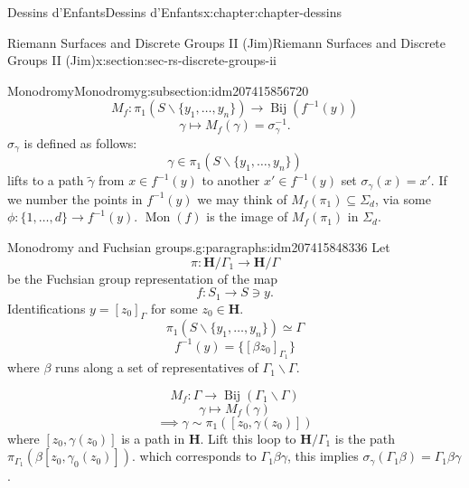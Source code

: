 \documentclass[oneside,10pt,]{book}
\numberwithin{equation}{section}
\newcommand{\inv}{^{-1}}
\newcommand{\lb}{[}
\newcommand{\rb}{]}
\newcommand{\HH}{\mathbf{H}}
\begin{document}
\begin{chapterptx}{Dessins d'Enfants}{}{Dessins d'Enfants}{}{}{x:chapter:chapter-dessins}
\begin{sectionptx}{Riemann Surfaces and Discrete Groups II (Jim)}{}{Riemann Surfaces and Discrete Groups II (Jim)}{}{}{x:section:sec-rs-discrete-groups-ii}
\begin{subsectionptx}{Monodromy}{}{Monodromy}{}{}{g:subsection:idm207415856720}
\begin{equation*}
M_f\colon \pi_1(S \smallsetminus \{y_1, \ldots, y_n\} )\to \operatorname{Bij} (f\inv (y))
\end{equation*}
%
\begin{equation*}
\gamma \mapsto M_f(\gamma) = \sigma_\gamma\inv\text{.}
\end{equation*}
\(\sigma_\gamma\) is defined as follows:%
\begin{equation*}
\gamma \in \pi_1(S\smallsetminus \{ y_1,\ldots, y_n\})
\end{equation*}
lifts to a path \(\widetilde \gamma\) from \(x\in f\inv(y)\) to another \(x' \in f\inv(y)\) set \(\sigma_\gamma(x) =x'\). If we number the points in \(f\inv (y)\) we may think of \(M_f(\pi_1)\subseteq \Sigma_d\), via some \(\phi\colon \{1,\ldots, d\}\to f\inv (y)\). \(\operatorname{Mon}(f)\) is the image of \(M_f(\pi_1)\) in \(\Sigma_d\).%
\begin{paragraphs}{Monodromy and Fuchsian groups.}{g:paragraphs:idm207415848336}%
Let%
\begin{equation*}
\pi \colon \HH/\Gamma_1 \to \HH/ \Gamma
\end{equation*}
be the Fuchsian group representation of the map%
\begin{equation*}
f\colon S_1 \to S\ni y\text{.}
\end{equation*}
Identifications \(y = \lb z_0 \rb_\Gamma\) for some \(z_0 \in \HH\).%
\begin{equation*}
\pi_1 (S\smallsetminus \{y_1,\ldots, y_n\}) \simeq \Gamma
\end{equation*}
%
\begin{equation*}
f\inv(y ) = \{ [\beta z_0]_{\Gamma_1}\}
\end{equation*}
where \(\beta\) runs along a set of representatives of \(\Gamma_1\backslash \Gamma\).%
\par
%
\begin{equation*}
M_f \colon \Gamma \to \operatorname{Bij} (\Gamma_1\backslash \Gamma)
\end{equation*}
%
\begin{equation*}
\gamma \mapsto M_f(\gamma)
\end{equation*}
%
\begin{equation*}
\implies \gamma \sim \pi_1([z_0,\gamma(z_0)])
\end{equation*}
where \(\lb z_0, \gamma(z_0) \rb\) is a path in \(\HH\). Lift this loop to \(\HH/\Gamma_1\) is the path \(\pi_{\Gamma_1}(\beta \lb z_0, \gamma_0(z_0)\rb)\). which corresponds to \(\Gamma_1 \beta \gamma\), this implies \(\sigma_\gamma(\Gamma_1\beta)  = \Gamma_1 \beta\gamma\).%

\end{paragraphs}
\end{subsectionptx}
\end{sectionptx}
\end{chapterptx}
\end{document}
